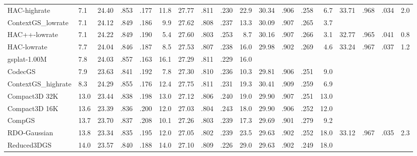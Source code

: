 {\begin{minipage}{\textheight}
\begin{adjustbox}{center}
\begin{tabular}{ll|lllr|lllr|lllr|lllr}
HAC-highrate & 7.1 & \cellcolor{lightyellow}24.40 & .853 & \cellcolor{lightyellow}.177 & 11.8 & \cellcolor{lightyellow}27.77 & \cellcolor{lightyellow}.811 & .230 & 22.9 & \cellcolor{lightyellow}30.34 & .906 & .258 & 6.7 & \cellcolor{lightorange}33.71 & \cellcolor{lightorange}.968 & \cellcolor{lightorange}.034 & 2.0 \\
ContextGS_lowrate & 7.1 & 24.12 & .849 & .186 & 9.9 & 27.62 & .808 & .237 & 13.3 & 30.09 & .907 & .265 & \cellcolor{lightyellow}3.7 &  &  &  &  \\
HAC++-lowrate & 7.1 & 24.22 & .849 & .190 & \cellcolor{lightred}5.4 & 27.60 & .803 & .253 & \cellcolor{lightred}8.7 & 30.16 & .907 & .266 & \cellcolor{lightorange}3.1 & 32.77 & .965 & .041 & \cellcolor{lightred}0.8 \\
HAC-lowrate & 7.7 & 24.04 & .846 & .187 & 8.5 & 27.53 & .807 & .238 & 16.0 & 29.98 & .902 & .269 & 4.6 & 33.24 & \cellcolor{lightyellow}.967 & .037 & \cellcolor{lightorange}1.2 \\
gsplat-1.00M & 7.8 & 24.03 & \cellcolor{lightred}.857 & \cellcolor{lightred}.163 & 16.1 & 27.29 & \cellcolor{lightyellow}.811 & \cellcolor{lightyellow}.229 & 16.0 &  &  &  &  &  &  &  &  \\
CodecGS & 7.9 & 23.63 & .841 & .192 & 7.8 & 27.30 & .810 & .236 & \cellcolor{lightorange}10.3 & 29.81 & .906 & .251 & 9.0 &  &  &  &  \\
ContextGS_highrate & 8.3 & 24.29 & \cellcolor{lightyellow}.855 & \cellcolor{lightorange}.176 & 12.4 & 27.75 & \cellcolor{lightyellow}.811 & .231 & 19.3 & \cellcolor{lightred}30.41 & \cellcolor{lightyellow}.909 & .259 & 6.9 &  &  &  &  \\
Compact3D 32K & 13.0 & 23.44 & .838 & .198 & 13.0 & 27.12 & .806 & .240 & 19.0 & 29.90 & .907 & .251 & 13.0 &  &  &  &  \\
Compact3D 16K & 13.6 & 23.39 & .836 & .200 & 12.0 & 27.03 & .804 & .243 & 18.0 & 29.90 & .906 & .252 & 12.0 &  &  &  &  \\
CompGS & 13.7 & 23.70 & .837 & .208 & 10.1 & 27.26 & .803 & .239 & 17.3 & 29.69 & .901 & .279 & 9.2 &  &  &  &  \\
RDO-Gaussian & 13.8 & 23.34 & .835 & .195 & 12.0 & 27.05 & .802 & .239 & 23.5 & 29.63 & .902 & .252 & 18.0 & 33.12 & \cellcolor{lightyellow}.967 & \cellcolor{lightyellow}.035 & 2.3 \\
Reduced3DGS & 14.0 & 23.57 & .840 & .188 & 14.0 & 27.10 & .809 & \cellcolor{lightorange}.226 & 29.0 & 29.63 & .902 & \cellcolor{lightyellow}.249 & 18.0 &  &  &  &  \\

\end{tabular}
\end{adjustbox}
\end{minipage}}
